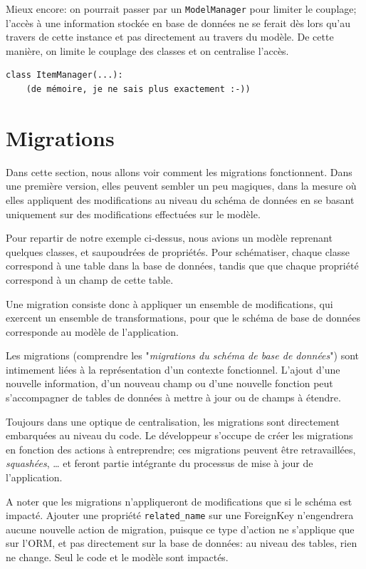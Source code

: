 \documentclass[11pt]{amsbook}
\begin{document}
Mieux encore: on pourrait passer par un \texttt{ModelManager} pour limiter le couplage; l’accès à une information stockée en base de données ne se ferait dès lors qu’au travers de cette instance et pas directement au travers du modèle. De cette manière, on limite le couplage des classes et on centralise l’accès.


\begin{verbatim}
class ItemManager(...):
    (de mémoire, je ne sais plus exactement :-))
\end{verbatim}

\hypertarget{x-migrations}{\chapter{Migrations}}
Dans cette section, nous allons voir comment les migrations fonctionnent.
Dans une première version, elles peuvent sembler un peu magiques, dans la mesure où elles appliquent des modifications au niveau du schéma de données en se basant uniquement sur des modifications effectuées sur le modèle.


Pour repartir de notre exemple ci-dessus, nous avions un modèle reprenant quelques classes, et saupoudrées de propriétés.
Pour schématiser, chaque classe correspond à une table dans la base de données, tandis que que chaque propriété correspond à un champ de cette table.


Une migration consiste donc à appliquer un ensemble de modifications, qui exercent un ensemble de transformations, pour que le schéma de base de données corresponde au modèle de l’application.


Les migrations (comprendre les "\emph{migrations du schéma de base de données}") sont intimement liées à la représentation d’un contexte fonctionnel. L’ajout d’une nouvelle information, d’un nouveau champ ou d’une nouvelle fonction peut s’accompagner de tables de données à mettre à jour ou de champs à étendre.


Toujours dans une optique de centralisation, les migrations sont directement embarquées au niveau du code. Le développeur s’occupe de créer les migrations en fonction des actions à entreprendre; ces migrations peuvent être retravaillées, \emph{squashées}, …​ et feront partie intégrante du processus de mise à jour de l’application.


A noter que les migrations n’appliqueront de modifications que si le schéma est impacté. Ajouter une propriété \texttt{related\_name} sur une ForeignKey n’engendrera aucune nouvelle action de migration, puisque ce type d’action ne s’applique que sur l’ORM, et pas directement sur la base de données: au niveau des tables, rien ne change. Seul le code et le modèle sont impactés.
\end{document}
